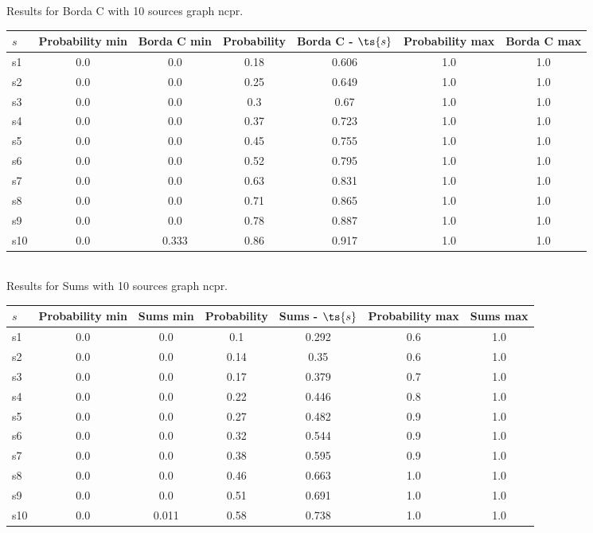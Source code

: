 \documentclass{article}
\begin{document}
\noindent Results for Borda C with 10 sources graph ncpr.

\noindent\begin{tabular}{|l|c|c|c|c|c|c|}
\hline
$s$& Probability min & Borda C min & Probability & Borda C - $\ts{s}$ & Probability max & Borda C max\\
\hline
s1 &0.0 & 0.0 & 0.18 & 0.606 & 1.0 & 1.0\\
\hline
s2 &0.0 & 0.0 & 0.25 & 0.649 & 1.0 & 1.0\\
\hline
s3 &0.0 & 0.0 & 0.3 & 0.67 & 1.0 & 1.0\\
\hline
s4 &0.0 & 0.0 & 0.37 & 0.723 & 1.0 & 1.0\\
\hline
s5 &0.0 & 0.0 & 0.45 & 0.755 & 1.0 & 1.0\\
\hline
s6 &0.0 & 0.0 & 0.52 & 0.795 & 1.0 & 1.0\\
\hline
s7 &0.0 & 0.0 & 0.63 & 0.831 & 1.0 & 1.0\\
\hline
s8 &0.0 & 0.0 & 0.71 & 0.865 & 1.0 & 1.0\\
\hline
s9 &0.0 & 0.0 & 0.78 & 0.887 & 1.0 & 1.0\\
\hline
s10 &0.0 & 0.333 & 0.86 & 0.917 & 1.0 & 1.0\\
\hline
\end{tabular}\\

\noindent Results for Sums with 10 sources graph ncpr.

\noindent\begin{tabular}{|l|c|c|c|c|c|c|}
\hline
$s$& Probability min & Sums min & Probability & Sums - $\ts{s}$ & Probability max & Sums max\\
\hline
s1 &0.0 & 0.0 & 0.1 & 0.292 & 0.6 & 1.0\\
\hline
s2 &0.0 & 0.0 & 0.14 & 0.35 & 0.6 & 1.0\\
\hline
s3 &0.0 & 0.0 & 0.17 & 0.379 & 0.7 & 1.0\\
\hline
s4 &0.0 & 0.0 & 0.22 & 0.446 & 0.8 & 1.0\\
\hline
s5 &0.0 & 0.0 & 0.27 & 0.482 & 0.9 & 1.0\\
\hline
s6 &0.0 & 0.0 & 0.32 & 0.544 & 0.9 & 1.0\\
\hline
s7 &0.0 & 0.0 & 0.38 & 0.595 & 0.9 & 1.0\\
\hline
s8 &0.0 & 0.0 & 0.46 & 0.663 & 1.0 & 1.0\\
\hline
s9 &0.0 & 0.0 & 0.51 & 0.691 & 1.0 & 1.0\\
\hline
s10 &0.0 & 0.011 & 0.58 & 0.738 & 1.0 & 1.0\\
\hline
\end{tabular}\\
\end{document}
